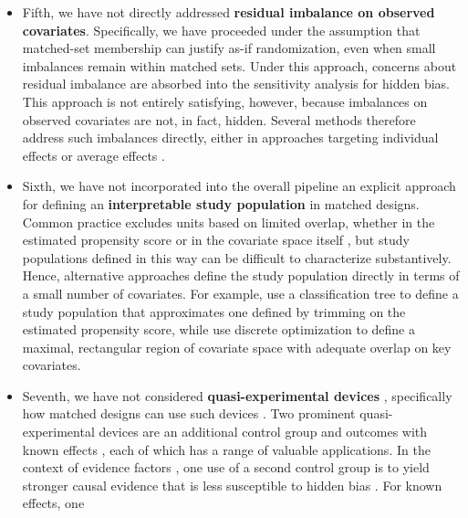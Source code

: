 \documentclass[twoside,11pt]{article}
\begin{document}
\begin{itemize}
  including subsequent contributions by
  \citet{gagnon-bartschshem-tov2019} and \citet{branson2021}, as well as
  related approaches based on the stepwise intersection--union principle
  \citep{hansensales2015}.
\item
  Fifth, we have not directly addressed \textbf{residual imbalance on observed
  covariates}. Specifically, we have proceeded under the assumption that
  matched-set membership can justify as-if randomization, even when
  small imbalances remain within matched sets. Under this approach,
  concerns about residual imbalance are absorbed into the sensitivity
  analysis for hidden bias. This approach is not entirely satisfying,
  however, because imbalances on observed covariates are not, in fact,
  hidden. Several methods therefore address such imbalances directly,
  either in approaches targeting individual effects
  \citep{rosenbaum1988, pimentelhuang2024, chenetal2023, hengetal2025}
  or average effects \citep{zhuetal2025}.
\item
  Sixth, we have not incorporated into the overall pipeline an explicit
  approach for defining an \textbf{interpretable study population} in
  matched designs. Common practice excludes units based on limited
  overlap, whether in the estimated propensity score \citep{crumpetal2009}
  or in the covariate space itself \citep{kingzeng2006}, but study populations defined in
  this way can be difficult to characterize substantively. Hence,
  alternative approaches define the study population directly in terms
  of a small number of covariates. For example, \citet{traskinsmall2011}
  use a classification tree to define a study population that
  approximates one defined by trimming on the estimated propensity
  score, while \citet{fogartyetal2016} use discrete optimization to
  define a maximal, rectangular region of covariate space with adequate
  overlap on key covariates.
\item
  Seventh, we have not considered \textbf{quasi-experimental devices}
  \citep{campbell1957, campbellstanley1963, shadishetal2002},
  specifically how matched designs can use such devices
  \citep[see][Part~IV]{rosenbaum2025}. Two prominent
  quasi-experimental devices are an additional control group
  \citep{rosenbaum1987b} and outcomes with known effects
  \citep{rosenbaum1989}, each of which has a range of valuable
  applications. In the context of evidence factors
  \citep{rosenbaum2021}, one use of a second control group is to yield
  stronger causal evidence that is less susceptible to hidden
  bias \citep{rosenbaum2023b}. For known effects, one

\end{itemize}
\end{document}
